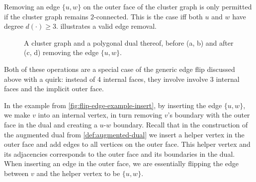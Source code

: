 Removing an edge $\{u,w\}$ on the outer face of the cluster graph is only permitted if the cluster graph remains $2$-connected. This is the case iff both $u$ and $w$ have degree $d(\cdot) \geq 3$.  illustrates a valid edge removal.

\begin{figure}[H]
	\centering
	\quad
	\qquad
	\quad
	\caption{A cluster graph and a polygonal dual thereof, before (a, b) and after (c, d) removing the edge $\{u,w\}$.}
	\label{fig:flip-edge-example-remove}
\end{figure}

Both of these operations are a special case of the generic edge flip discussed above with a quirk: instead of 4 internal faces, they involve involve 3 internal faces and the implicit outer face.

In the example from \cref{fig:flip-edge-example-insert}, by inserting the edge $\{u,w\}$, we make $v$ into an internal vertex, in turn removing $v$'s boundary with the outer face in the dual and creating a $u$-$w$ boundary. Recall that in the construction of the augmented dual from \cref{def:augmented-dual} we insert a helper vertex in the outer face and add edges to all vertices on the outer face. This helper vertex and its adjacencies corresponds to the outer face and its boundaries in the dual. When inserting an edge in the outer face, we are essentially flipping the edge between $v$ and the helper vertex to be $\{u,w\}$.

